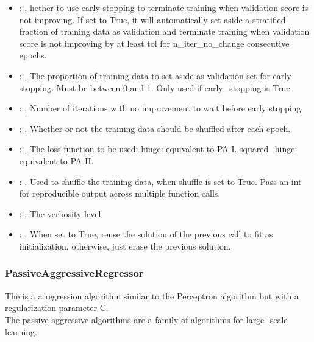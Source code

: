 \begin{itemize}
    \item {}: , 
      hether to use early stopping to terminate training when validation score is not
      improving. If set to True, it will automatically set aside a stratified fraction of training
      data as validation and terminate training when validation score is not improving by at least
      tol for n\_iter\_no\_change consecutive epochs.

    \item {}: , 
      The proportion of training data to set aside as validation set for early stopping.
      Must be between 0 and 1. Only used if early\_stopping is True.

    \item {}: , 
      Number of iterations with no improvement to wait before early stopping.

    \item {}: , 
      Whether or not the training data should be shuffled after each epoch.

    \item {}: , 
      The loss function to be used: hinge: equivalent to PA-I.
      squared\_hinge: equivalent to PA-II.

    \item {}: , 
      Used to shuffle the training data, when shuffle is set to
      True. Pass an int for reproducible output across multiple function calls.

    \item {}: , 
      The verbosity level

    \item {}: , 
      When set to True, reuse the solution of the previous call
      to fit as initialization, otherwise, just erase the previous solution.
  \end{itemize}


\subsubsection{PassiveAggressiveRegressor}
  The                          is a a regression algorithm
  similar to the Perceptron algorithm                         but with a regularization parameter C.
  \\The passive-aggressive algorithms are a family of algorithms for                         large-
  scale learning.                         

